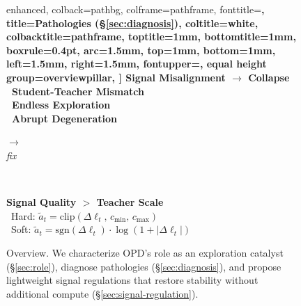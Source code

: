 \begin{figure}[t]
\begin{tcolorbox}
\begin{minipage}[c]{0.30\linewidth}
\begin{tcolorbox}
  enhanced,
  colback=pathbg,
  colframe=pathframe,
  fonttitle=\bfseries\footnotesize,
  title={Pathologies (\S\ref{sec:diagnosis})},
  coltitle=white,
  colbacktitle=pathframe,
  toptitle=1mm, bottomtitle=1mm,
  boxrule=0.4pt,
  arc=1.5mm,
  top=1mm, bottom=1mm, left=1.5mm, right=1.5mm,
  fontupper=\scriptsize,
  equal height group=overviewpillar,
]
\textbf{Signal Misalignment $\to$ Collapse}\\[2pt]
{\scriptsize\color{black!70}%
\textbullet~Student-Teacher Mismatch\\
\textbullet~Endless Exploration\\
\textbullet~Abrupt Degeneration}
\end{tcolorbox}
\end{minipage}%
\hfill
\begin{minipage}[c]{0.03\linewidth}
\centering
{\color{black!30}\large$\rightarrow$}\\[1pt]
{\color{black!50}\footnotesize\itshape fix}
\end{minipage}%
\hfill
\begin{minipage}[c]{0.30\linewidth}
\\[-2.5pt]
\begin{tcolorbox}[
  enhanced,
  colback=regbg,
  colframe=regframe,
  fonttitle=\bfseries\footnotesize,
  title={Regulations (\S\ref{sec:signal-regulation})},
  coltitle=white,
  colbacktitle=regframe,
  toptitle=1mm, bottomtitle=1mm,
  boxrule=0.4pt,
  arc=1.5mm,
  top=1mm, bottom=1mm, left=1.5mm, right=1.5mm,
  fontupper=\scriptsize,
  equal height group=overviewpillar,
]
\textbf{Signal Quality $>$ Teacher Scale}\\[2pt]
{\scriptsize\color{black!70}%
\textbullet~Hard: $\tilde{a}_t{=}\mathrm{clip}(\Delta\ell_t,\,c_{\min},\,c_{\max})$\\
\textbullet~Soft: $\tilde{a}_t{=}\mathrm{sgn}(\Delta\ell_t)\!\cdot\!\log(1{+}|\Delta\ell_t|)$
}
\end{tcolorbox}
\end{minipage}
\end{tcolorbox}
\vspace{-5mm}
\caption{Overview. We characterize OPD's role as an exploration catalyst (\S\ref{sec:role}), diagnose pathologies (\S\ref{sec:diagnosis}), and propose lightweight signal regulations that restore stability without additional compute (\S\ref{sec:signal-regulation}). 
}
\label{fig:overview}
\vspace{-4mm}
\end{figure}
